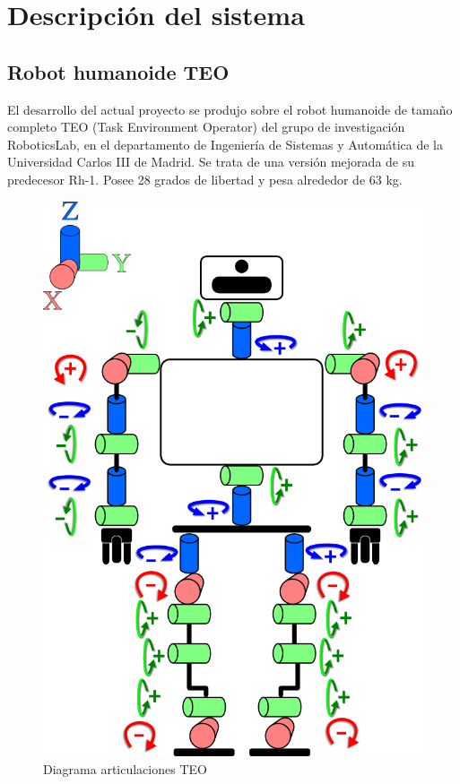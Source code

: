 \section{Descripción del sistema}

\subsection{Robot humanoide TEO}

El desarrollo del actual proyecto se produjo sobre el robot humanoide de tamaño completo TEO (Task Environment Operator) del grupo de investigación RoboticsLab, en el departamento de Ingeniería de Sistemas y Automática de la Universidad Carlos III de Madrid. Se trata de una versión mejorada de su predecesor Rh-1. Posee 28 grados de libertad y pesa alrededor de 63 kg.

\begin{figure}[H]
\centering
\includegraphics[scale=0.3]{imagenes/apartado_3/31_teo_joints}
\caption{Diagrama articulaciones TEO}
\label{figura31}
\end{figure}

